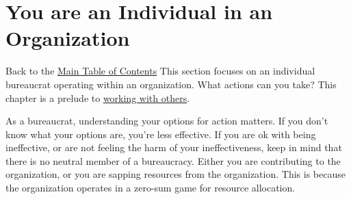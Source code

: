 \documentclass{book}
\begin{document}
     \clearpage
     \clearpage
     \clearpage
     \clearpage
     \clearpage
     \clearpage
     \clearpage
     \clearpage
     \clearpage

\chapter{You are an Individual in an Organization\label{sec:individual-in-org}}
  {\footnotesize Back to the \hyperref[sec:toc]{Main Table of Contents}}
  \minitoc
    This section focuses on an individual bureaucrat operating within an organization. What actions can you take?  This chapter is a prelude to 
    \hyperref[sec:working-with-other-bureaucrats]{working with others}.
    
    As a bureaucrat, understanding your options for action matters. If you don't know what your options are, you're less effective. If you are ok with being ineffective, or are not feeling the harm of your ineffectiveness, keep in mind that
    there is no neutral member of a bureaucracy. Either you are contributing to the organization, or you are sapping resources from the organization. This is because the organization operates in a zero-sum game for resource allocation.
     \clearpage
     \clearpage
     \clearpage
     \clearpage %
     \clearpage

 \clearpage %
     \clearpage
     \clearpage
     \clearpage
     \clearpage
     \clearpage
     
    \clearpage
     \clearpage
     \clearpage
     \clearpage
\end{document}

